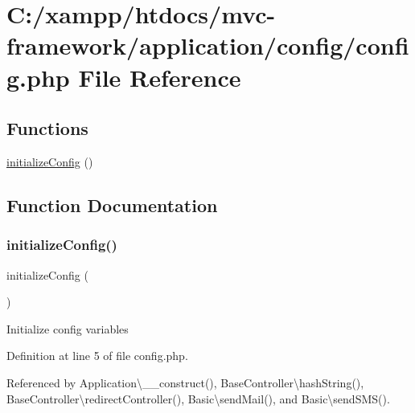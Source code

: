 \hypertarget{config_8php}{}\section{C\+:/xampp/htdocs/mvc-\/framework/application/config/config.php File Reference}
\label{config_8php}
\subsection*{Functions}
\begin{DoxyCompactItemize}
\item 
\hyperlink{config_8php_afeb1d281d402615776fdb0320a5b8d05}{initialize\+Config} ()
\end{DoxyCompactItemize}


\subsection{Function Documentation}
\hypertarget{config_8php_afeb1d281d402615776fdb0320a5b8d05}{}\label{config_8php_afeb1d281d402615776fdb0320a5b8d05} 
\subsubsection{\texorpdfstring{initialize\+Config()}{initializeConfig()}}
{\footnotesize\ttfamily initialize\+Config (\begin{DoxyParamCaption}{ }\end{DoxyParamCaption})}

Initialize config variables 

Definition at line 5 of file config.\+php.



Referenced by Application\textbackslash{}\+\_\+\+\_\+construct(), Base\+Controller\textbackslash{}hash\+String(), Base\+Controller\textbackslash{}redirect\+Controller(), Basic\textbackslash{}send\+Mail(), and Basic\textbackslash{}send\+S\+M\+S().


